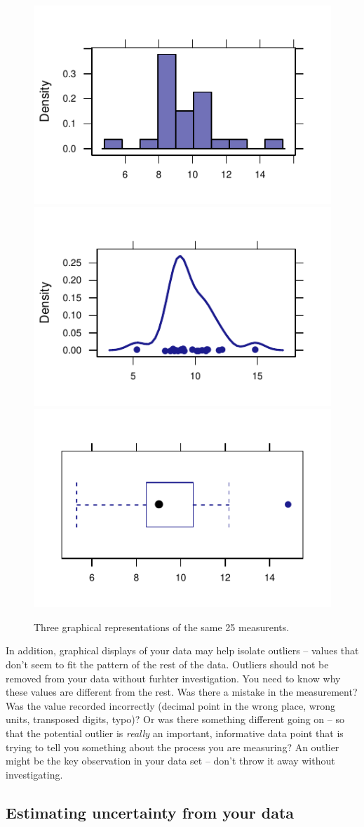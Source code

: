 \documentclass[twoside]{book}\usepackage[]{graphicx}\usepackage[]{xcolor}
\newenvironment{knitrout}{}{} %
\begin{document}
\begin{figure}[h]
\begin{knitrout}
\color{fgcolor}

{\centering \includegraphics[width=.3\textwidth]{figures/fig-unnamed-chunk-124-1} 
\includegraphics[width=.3\textwidth]{figures/fig-unnamed-chunk-124-2} 
\includegraphics[width=.3\textwidth]{figures/fig-unnamed-chunk-124-3} 

}



\end{knitrout}
\caption{Three graphical representations of the same 25 measurents.}
\end{figure}


In addition, graphical displays of your data may help isolate outliers -- values
that don't seem to fit the pattern of the rest of the data.  Outliers should not be removed
from your data without furhter investigation.  You need to know why these values are 
different from the rest.  Was there a mistake in the measurement?  Was the value recorded
incorrectly (decimal point in the wrong place, wrong units, transposed digits, typo)?
Or was there something different going on -- so that the potential outlier is \emph{really} an important, informative data point that is trying to tell you something about the process you are measuring?  An outlier might be the key observation in 
your data set -- don't throw it away without investigating.

\subsection{Estimating uncertainty from your data}
\label{sec:uncertainty-from-data}
\end{document}
